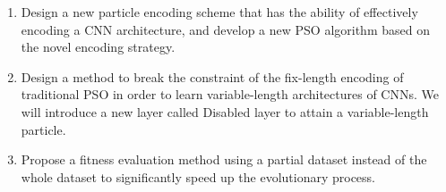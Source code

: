 \documentclass[conference]{IEEEtran}
\begin{document}
\begin{enumerate}
	\item Design a new particle encoding scheme that has the ability of effectively encoding a CNN architecture, and develop a new PSO algorithm based on the novel encoding strategy. 
	\item Design a method to break the constraint of the fix-length encoding of traditional PSO in order to learn variable-length architectures of CNNs. We will introduce a new layer called Disabled layer to attain a variable-length particle.
	\item Propose a fitness evaluation method using a partial dataset instead of the whole dataset to significantly speed up the evolutionary process. 
\end{enumerate} 

\end{document}
